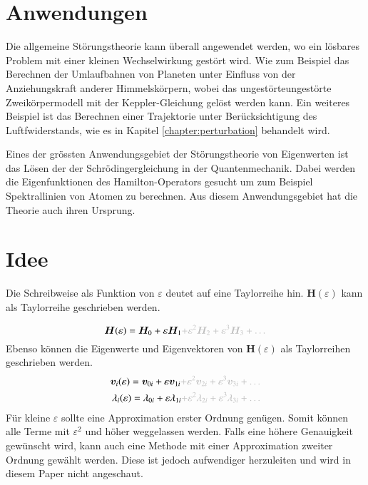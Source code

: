 \section{Anwendungen}

Die allgemeine Störungstheorie kann überall angewendet werden, wo ein lösbares Problem mit einer kleinen Wechselwirkung gestört wird.
Wie zum Beispiel das Berechnen der Umlaufbahnen von Planeten unter Einfluss von der Anziehungskraft anderer Himmelskörpern, wobei das ungestörteungestörte Zweikörpermodell mit der Keppler-Gleichung gelöst werden kann.  
Ein weiteres Beispiel ist das Berechnen einer Trajektorie unter Berücksichtigung des Luftfwiderstands, wie es in Kapitel \ref{chapter:perturbation} behandelt wird.

Eines der grössten Anwendungsgebiet der Störungstheorie von Eigenwerten ist das Lösen der der Schrödingergleichung in der Quantenmechanik.
Dabei werden die Eigenfunktionen des Hamilton-Operators gesucht um zum Beispiel Spektrallinien von Atomen zu berechnen.
Aus diesem Anwendungsgebiet hat die Theorie auch ihren Ursprung. %

\section{Idee}

Die Schreibweise als Funktion von $\varepsilon$ deutet auf eine Taylorreihe hin.
$\bm H(\varepsilon)$ kann als Taylorreihe geschrieben werden.

\begin{equation*}
    \bm H(\varepsilon) = \bm H_0 + \varepsilon \bm H_1 \GR{ + \varepsilon^2 \bm H_2  + \varepsilon^3 \bm H_3 + \dots}
\end{equation*}
Ebenso können die Eigenwerte und Eigenvektoren von $\bm H(\varepsilon)$ als Taylorreihen geschrieben werden.
\begin{align}
    \bm v_i(\varepsilon) = \bm v_{0i} + \varepsilon \bm v_{1i} \GR{ + \varepsilon^2 \bm v_{2i}  + \varepsilon^3 \bm v_{3i} + \dots} \label{ew:eq:eigvec} \\
    \lambda_i(\varepsilon) = \lambda_{0i} + \varepsilon \lambda_{1i} \GR{ + \varepsilon^2 \lambda_{2i}  + \varepsilon^3 \lambda_{3i} + \dots}  \label{ew:eq:eigval}
\end{align}
Für kleine $\varepsilon$ sollte eine Approximation erster Ordnung genügen.
Somit können alle Terme mit $\varepsilon^2$ und höher weggelassen werden.
Falls eine höhere Genauigkeit gewünscht wird, kann auch eine Methode mit einer Approximation zweiter Ordnung gewählt werden.
Diese ist jedoch aufwendiger herzuleiten und wird in diesem Paper nicht angeschaut.

